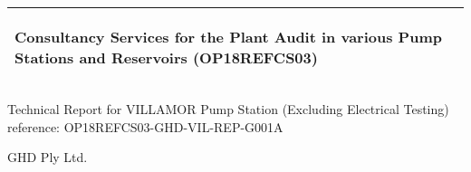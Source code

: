 %
\begin{titlepage}
  \addtolength{\hoffset}{0.5\evensidemargin-0.5\oddsidemargin} %
  \noindent%
  \begin{tabular}{@{}p{\textwidth}@{}}
    \toprule[2pt]
    \midrule
    \vspace{0.2cm}
    \begin{center}
    \Huge{\textbf{
      Consultancy Services for the Plant Audit in various Pump Stations and Reservoirs (OP18REFCS03) %
    }}
    \end{center}
    \begin{center}
      \Large{
      }
    \end{center}
    \vspace{0.2cm}\\
    \midrule
    \toprule[2pt]
  \end{tabular}
  \vspace{4 cm}
  \begin{center}
    {\large
      Technical Report for VILLAMOR Pump Station (Excluding Electrical Testing)%
    }\\
    \vspace{0.2cm}
    {\Large
      reference: OP18REFCS03-GHD-VIL-REP-G001A%
    }
  \end{center}
  \vfill
  \begin{center}
  GHD Ply Ltd.\\
  \end{center}
\end{titlepage}
\clearpage
